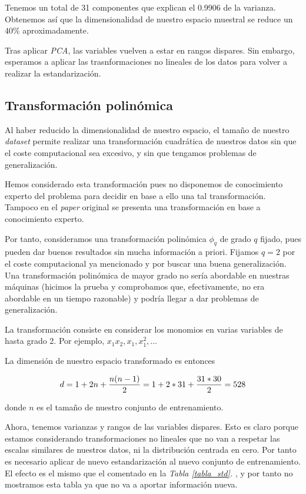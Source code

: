 \documentclass[11pt]{article}
\begin{document}
Tenemos un total de 31 componentes que explican el 0.9906 de la varianza. Obtenemos así que la dimensionalidad de nuestro espacio muestral se reduce un $40\%$ aproximadamente.

Tras aplicar \emph{PCA}, las variables vuelven a estar en rangos dispares. Sin embargo, esperamos a aplicar las trasnformaciones no lineales de los datos para volver a realizar la estandarización.

\subsection{Transformación polinómica}


Al haber reducido la dimensionalidad de nuestro espacio, el tamaño de nuestro \emph{dataset} permite realizar una transformación cuadrática de nuestros datos sin que el coste computacional sea excesivo, y sin que tengamos problemas de generalización.

Hemos considerado esta transformación pues no disponemos de conocimiento experto del problema para decidir en base a ello una tal transformación. Tampoco en el \emph{paper} original \cite{original_paper:paper} se presenta una transformación en base a conocimiento experto.

Por tanto, consideramos una transformación polinómica $\phi_q$ de grado $q$ fijado, pues pueden dar buenos resultados sin mucha información a priori. Fijamos $q=2$ por el coste computacional ya mencionado y por buscar una buena generalización. Una transformación polinómica de mayor grado no sería abordable en nuestras máquinas (hicimos la prueba y comprobamos que, efectivamente, no era abordable en un tiempo razonable) y podría llegar a dar problemas de generalización.

La transformación consiste en considerar los monomios en varias variables de hasta grado 2. Por ejemplo, $x_1 x_2, x_1, x_1^2, \ldots$

La dimensión de nuestro espacio transformado es entonces

$$d = {1+2n}+{{n(n-1)}\over{2}} = {1+2*31}+{{31*30}\over{2}} = 528$$

donde $n$ es el tamaño de nuestro conjunto de entrenamiento.

Ahora, tenemos varianzas y rangos de las variables dispares. Esto es claro porque estamos considerando transformaciones no lineales que no van a respetar las escalas similares de nuestros datos, ni la distribución centrada en cero. Por tanto es necesario aplicar de nuevo estandarización al nuevo conjunto de entrenamiento. El efecto es el mismo que el comentado en la \emph{Tabla \ref{tabla_std}. }, y por tanto no mostramos esta tabla ya que no va a aportar información nueva.
\end{document}

